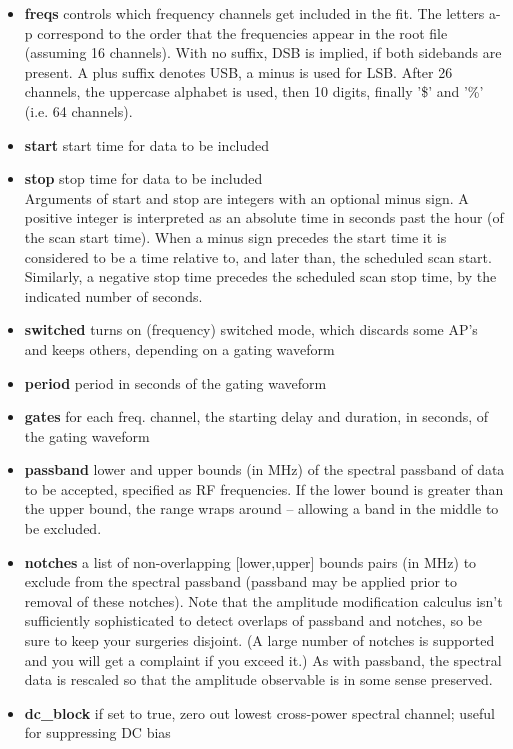 \begin{itemize}
\item[]\textbf{freqs}        controls which frequency channels get included in the fit.
                 The letters a-p correspond to the order that the frequencies
                 appear in the root file (assuming 16 channels). With no
                 suffix, DSB is implied, if both sidebands are present.
                 A plus suffix denotes USB, a minus is used for LSB.
                 After 26 channels, the uppercase alphabet is used,
                 then 10 digits, finally '\$' and '\%' (i.e. 64 channels).
\item[]\textbf{start}        start time for data to be included
\item[]\textbf{stop}         stop time for data to be included \\
                 Arguments of start and stop are integers with an optional
                 minus sign. A positive integer is interpreted as an
                 absolute time in seconds past the hour (of the scan
                 start time). When a minus sign precedes the start time
                 it is considered to be a time relative to, and later
                 than, the scheduled scan start. Similarly, a negative
                 stop time precedes the scheduled scan stop time, by
                 the indicated number of seconds.
\item[]\textbf{switched}     turns on (frequency) switched mode, which discards some AP's
                 and keeps others, depending on a gating waveform
\item[]\textbf{period}       period in seconds of the gating waveform
\item[]\textbf{gates}        for each freq. channel, the starting delay and duration, in
                 seconds, of the gating waveform
\item[]\textbf{passband}     lower and upper bounds (in MHz) of the spectral passband of
                 data to be accepted, specified as RF frequencies. If the
                 lower bound is greater than the upper bound, the range
                 wraps around -- allowing a band in the middle to be
                 excluded.
\item[]\textbf{notches}     a list of non-overlapping [lower,upper] bounds pairs (in MHz)
                 to exclude from the spectral passband (passband may be
                 applied prior to removal of these notches). Note that the
                 amplitude modification calculus isn't sufficiently
                 sophisticated to detect overlaps of passband and notches,
                 so be sure to keep your surgeries disjoint.  (A large number of notches
                 is supported and you will get a complaint if you exceed it.)
                 As with passband, the spectral data is rescaled so that
                 the amplitude observable is in some sense preserved.
\item[]\textbf{dc\_block}     if set to true, zero out lowest cross-power spectral
                 channel; useful for suppressing DC bias
\end{itemize}


